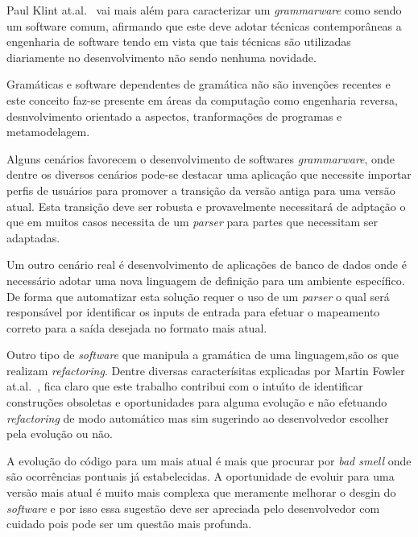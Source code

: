 Paul Klint at.al.~\cite{klint2005toward} vai mais al\'{e}m para caracterizar um {\it grammarware} como sendo um software comum, afirmando que este deve  adotar t\'{e}cnicas contempor\^{a}neas a engenharia de software tendo em vista que tais t\'{e}cnicas s\~{a}o utilizadas diariamente no desenvolvimento n\~{a}o sendo nenhuma novidade.

Gram\'{a}ticas e software dependentes de gram\'{a}tica n\~{a}o s\~{a}o inven\c{c}\~{o}es recentes e este conceito faz-se presente em \'{a}reas da computa\c{c}\~{a}o como engenharia reversa, desnvolvimento orientado a aspectos, tranforma\c{c}\~{o}es de programas e metamodelagem.

Alguns cen\'{a}rios favorecem o desenvolvimento de softwares {\it grammarware}, onde dentre os diversos cen\'{a}rios pode-se destacar uma aplicaç\~{a}o que necessite importar perfis de usu\'{a}rios para promover a transi\c{c}\~{a}o da vers\~{a}o antiga para uma vers\~{a}o atual. Esta transi\c{c}\~{a}o deve ser robusta e provavelmente necessitar\'{a} de adpta\c{c}\~{a}o o que em muitos casos necessita de um \textit{parser} para partes que necessitam ser adaptadas.

Um outro cen\'{a}rio real \'{e} desenvolvimento de aplica\c{c}\~{o}es de banco de dados onde \'{e} necess\'{a}rio adotar uma nova linguagem de defini\c{c}\~{a}o para um ambiente espec\'{i}fico. De forma que automatizar esta solu\c{c}\~{a}o requer o uso de um \textit{parser} o qual ser\'{a} respons\'{a}vel por identificar os inputs de entrada para efetuar o mapeamento correto para a sa\'{i}da desejada no formato mais atual.

Outro tipo de \textit{software} que manipula a gram\'{a}tica de uma linguagem,s\~{a}o os que realizam \textit{refactoring}. Dentre diversas caracter\'{i}sitas explicadas por Martin Fowler at.al.~\cite{martinFowlerRafactoring}, fica claro que este trabalho contribui com o intu\'{\i}to de identificar constru\c{c}\~{o}es obsoletas e oportunidades para alguma evolu\c{c}\~{a}o e n\~{a}o efetuando \textit{refactoring} de modo autom\'{a}tico mas sim sugerindo ao desenvolvedor escolher pela evolu\c{c}\~{a}o ou n\~{a}o.

A evolu\c{c}\~{a}o do c\'{o}digo para um mais atual \'{e} mais que procurar por \textit{bad smell} onde s\~{a}o ocorr\^{e}ncias pontuais j\'{a} estabelecidas. A oportunidade de evoluir para uma vers\~{a}o mais atual \'{e} muito mais complexa que meramente melhorar o desgin do \textit{software} e por isso essa sugest\~{a}o deve ser apreciada pelo desenvolvedor com cuidado pois pode ser um quest\~{a}o mais profunda. %

